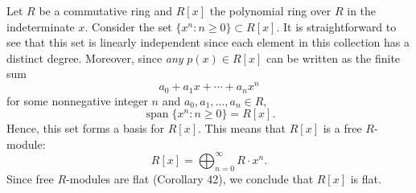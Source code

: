 \documentclass{article}
\begin{document}
	Let $R$ be a commutative ring and $R[x]$ the polynomial ring over $R$ in the indeterminate $x$. Consider the set $\{x^{n}: n\geq 0\} \subset R[x]$. It is straightforward to see that this set is linearly independent since each element in this collection has a distinct degree. Moreover, since \textit{any} $p(x) \in R[x]$ can be written as the finite sum 
	\begin{equation*}
		a_{0} + a_{1}x + \dotsm + a_{n}x^{n}
	\end{equation*}
	for some nonnegative integer $n$ and $a_{0}, a_{1}, \ldots, a_{n} \in R$, 
	\begin{equation*}
		\operatorname{span}\{x^{n}: n\geq 0\} = R[x]. 
	\end{equation*}
	Hence, this set forms a basis for $R[x]$. This means that $R[x]$ is a free $R$-module:
	\begin{equation*}
		R[x] = \bigoplus_{n = 0}^{\infty}R \cdot x^{n}. 
	\end{equation*}
	Since free $R$-modules are flat (Corollary 42), we conclude that $R[x]$ is flat. 
	
\end{document}
